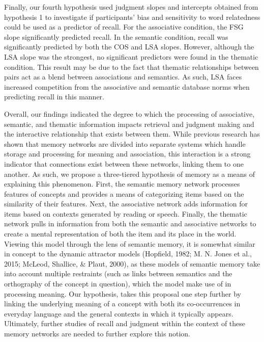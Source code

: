 \documentclass[english,man]{apa6}
\theoremstyle{definition}
\theoremstyle{definition}
\theoremstyle{remark}
\begin{document}
Finally, our fourth hypothesis used judgment slopes and intercepts
obtained from hypothesis 1 to investigate if participants' bias and
sensitivity to word relatedness could be used as a predictor of recall.
For the associative condition, the FSG slope significantly predicted
recall. In the semantic condition, recall was significantly predicted by
both the COS and LSA slopes. However, although the LSA slope was the
strongest, no significant predictors were found in the thematic
condition. This result may be due to the fact that thematic
relationships between pairs act as a blend between associations and
semantics. As such, LSA faces increased competition from the associative
and semantic database norms when predicting recall in this manner.

Overall, our findings indicated the degree to which the processing of
associative, semantic, and thematic information impacts retrieval and
judgment making and the interactive relationship that exists between
them. While previous research has shown that memory networks are divided
into separate systems which handle storage and processing for meaning
and association, this interaction is a strong indicator that connections
exist between these networks, linking them to one another. As such, we
propose a three-tiered hypothesis of memory as a means of explaining
this phenomenon. First, the semantic memory network processes features
of concepts and provides a means of categorizing items based on the
similarity of their features. Next, the associative network adds
information for items based on contexts generated by reading or speech.
Finally, the thematic network pulls in information from both the
semantic and associative networks to create a mental representation of
both the item and its place in the world. Viewing this model through the
lens of semantic memory, it is somewhat similar in concept to the
dynamic attractor models (Hopfield, 1982; M. N. Jones et al., 2015;
McLeod, Shallice, \& Plaut, 2000), as these models of semantic memory
take into account multiple restraints (such as links between semantics
and the orthography of the concept in question), which the model make
use of in processing meaning. Our hypothesis, takes this proposal one
step further by linking the underlying meaning of a concept with both
its co-occurrences in everyday language and the general contexts in
which it typically appears. Ultimately, further studies of recall and
judgment within the context of these memory networks are needed to
further explore this notion.
\end{document}
